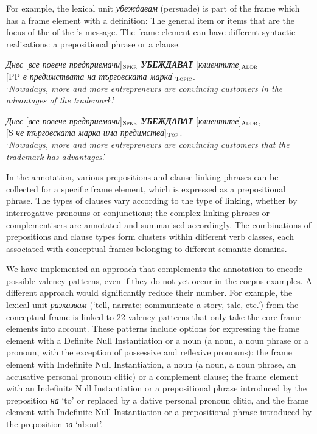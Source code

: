 \documentclass[output=paper,colorlinks,citecolor=brown]{langscibook}
\begin{document}
 For example, the lexical unit \textit{убеждавам} (persuade) is part of the frame  which has a frame element  with a definition: The general item or items that are the focus of the  of the 's message.
 The frame element  can have different syntactic realisations: a prepositional phrase or a clause.

 
\begin{exe}
 \ex  \label{ch01:ex:44}
 \textit{Днес} [\textit{все повече предприемачи}]$_{\text{\textsc{Spkr}}}$ \textit{\textbf{УБЕЖДАВАТ}} [\textit{клиентите}]$_{\text{\textsc{Addr}}}$ \\
$[$PP \textit{в предимствата на търговската марка}]$_{\text{\textsc{Topic}}}$. \\
 `\textit{Nowadays, more and more entrepreneurs are convincing customers in the advantages of the trademark}.'
 \end{exe} 

 
\begin{exe}
 \ex  \label{ch01:ex:45}
 \textit{Днес} [\textit{все повече предприемачи}]$_{\text{\textsc{Spkr}}}$ \textit{\textbf{УБЕЖДАВАТ}} [\textit{клиентите}]$_{\text{\textsc{Addr}}}$,  \\
$[$S \textit{че търговската марка има предимства}]$_{\text{\textsc{Top}}}$. \\
 `\textit{Nowadays, more and more entrepreneurs are convincing customers that the trademark has advantages}.'
 \end{exe} 

In the annotation, various prepositions and clause-linking phrases can be collected for a specific frame element, which is expressed as a prepositional phrase. The types of clauses vary according to the type of linking, whether by interrogative pronouns or conjunctions; the complex linking phrases or complementisers are annotated and summarised accordingly. The combinations of prepositions and clause types form clusters within different verb classes, each associated with conceptual frames belonging to different semantic domains.

We have implemented an approach that complements the annotation to encode possible valency patterns, even if they do not yet occur in the corpus examples. A different approach would significantly reduce their number. For example, the lexical unit \textit{разказвам} (`tell, narrate; communicate a story, tale, etc.') from the conceptual frame  is linked to 22 valency patterns that only take the core frame elements into account. These patterns include options for expressing the frame element  with a Definite Null Instantiation or a noun (a noun, a noun phrase or a pronoun, with the exception of possessive and reflexive pronouns): the frame element  with Indefinite Null Instantiation, a noun (a noun, a noun phrase, an accusative personal pronoun clitic) or a complement clause; the frame element  with an Indefinite Null Instantiation or a prepositional phrase introduced by the preposition \textit{на} `to' or replaced by a dative personal pronoun clitic, and the frame element  with Indefinite Null Instantiation or a prepositional phrase introduced by the preposition \textit{за} `about'.
\end{document}
